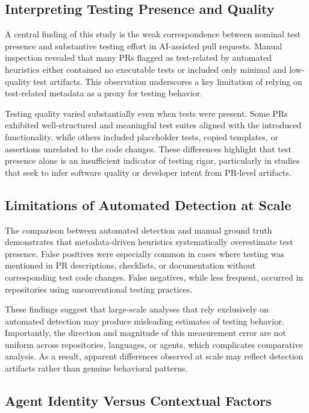 \documentclass[conference]{IEEEtran}
\begin{document}
\subsection{Interpreting Testing Presence and Quality}

A central finding of this study is the weak correspondence between nominal test presence and substantive testing effort in AI-assisted pull requests. Manual inspection revealed that many PRs flagged as test-related by automated heuristics either contained no executable tests or included only minimal and low-quality test artifacts. This observation underscores a key limitation of relying on test-related metadata as a proxy for testing behavior.

Testing quality varied substantially even when tests were present. Some PRs exhibited well-structured and meaningful test suites aligned with the introduced functionality, while others included placeholder tests, copied templates, or assertions unrelated to the code changes. These differences highlight that test presence alone is an insufficient indicator of testing rigor, particularly in studies that seek to infer software quality or developer intent from PR-level artifacts.

\subsection{Limitations of Automated Detection at Scale}

The comparison between automated detection and manual ground truth demonstrates that metadata-driven heuristics systematically overestimate test presence. False positives were especially common in cases where testing was mentioned in PR descriptions, checklists, or documentation without corresponding test code changes. False negatives, while less frequent, occurred in repositories using unconventional testing practices.

These findings suggest that large-scale analyses that rely exclusively on automated detection may produce misleading estimates of testing behavior. Importantly, the direction and magnitude of this measurement error are not uniform across repositories, languages, or agents, which complicates comparative analysis. As a result, apparent differences observed at scale may reflect detection artifacts rather than genuine behavioral patterns.

\subsection{Agent Identity Versus Contextual Factors}
\end{document}
